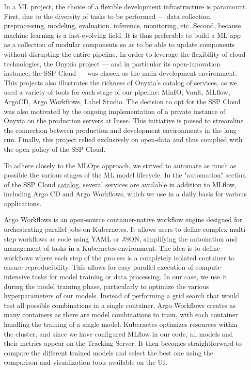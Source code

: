 In a ML project, the choice of a flexible development infrastructure is paramount. First, due to the diversity of tasks to be performed — data collection, preprocessing, modeling, evaluation, inference, monitoring, etc. Second, because machine learning is a fast-evolving field. It is thus preferable to build a ML app as a collection of modular components so as to be able to update components without disrupting the entire pipeline. In order to leverage the flexibility of cloud technologies, the Onyxia project — and in particular its open-innovation instance, the SSP Cloud — was chosen as the main development environment. This projects also illustrates the richness of Onyxia's catalog of services, as we used a variety of tools for each stage of our pipeline: MinIO, Vault, MLflow, ArgoCD, Argo Workflows, Label Studio. The decision to opt for the SSP Cloud was also motivated by the ongoing implementation of a private instance of Onyxia on the production servers at Insee. This initiative is poised to streamline the connection between production and development environments in the long run. Finally, this project relied exclusively on open-data and thus complied with the open policy of the SSP Cloud.

To adhere closely to the MLOps approach, we strived to automate as much as possible the various stages of the ML model lifecycle. In the "automation" section of the SSP Cloud \href{https://datalab.sspcloud.fr/catalog/automation}{catalog}, several services are available in addition to MLflow, including Argo CD and Argo Workflows, which we use in a daily basis for various applications.

Argo Workflows is an open-source container-native workflow engine designed for orchestrating parallel jobs on Kubernetes. It allows users to define complex multi-step workflows as code using YAML or JSON, simplifying the automation and management of tasks in a Kubernetes environment. The idea is to define workflows where each step of the process is a completely isolated container to ensure reproducibility. This allows for easy parallel execution of compute-intensive tasks for model training or data processing. In our case, we use it during the model training phase, particularly to optimize the various hyperparameters of our models. Instead of performing a grid search that would test all possible combinations in a single container, Argo Workflows creates as many containers as there are model combinations to train, with each container handling the training of a single model. Kubernetes optimizes resources within the cluster, and since we have configured MLflow in our code, all models and their metrics appear on the Tracking Server. It then becomes straightforward to compare the different trained models and select the best one using the comparison and visualization tools available on the UI. 

